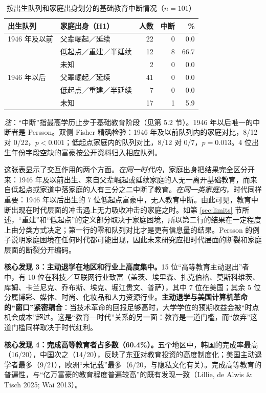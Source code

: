 \documentclass[UTF8,a4paper,11pt]{ctexart}
\begin{document}
\begin{table}[htbp]
\centering
\caption{按出生队列和家庭出身划分的基础教育中断情况（$n=101$）}
\label{tab:h2x}
\small
\begin{tabular}{llrrr}
\toprule
出生队列 & 家庭出身（H1） & 人数 & 中断 & \% \\
\midrule
1946 年及以前 & 父辈崛起／延续 & 22 & 0 & 0.0 \\
              & 低起点／重建／半延续 & 12 & 8 & 66.7 \\
              & 未知 & 2 & 0 & 0.0 \\
\midrule
1946 年以后   & 父辈崛起／延续 & 41 & 0 & 0.0 \\
              & 低起点／重建／半延续 & 7 & 0 & 0.0 \\
              & 未知 & 17 & 1 & 5.9 \\
\bottomrule
\end{tabular}

\smallskip
\parbox{0.92\linewidth}{\footnotesize\emph{注}：“中断”指最高学历止步于基础教育阶段（见第 5.2 节）。1946 年以后唯一的中断者是 Persson。双侧 Fisher 精确检验：1946 年及以前队列内的家庭对比，8/12 对 0/22，$p<0.001$；低起点家庭内的队列对比，8/12 对 0/7，$p=0.013$。4 位出生年份字段空缺的富豪按公开资料归入相应队列。}
\end{table}

这张表显示了交互作用的两个方面。\emph{在同一时代内}，家庭出身把结果完全区分开来：1946 年及以前出生、来自父辈崛起或延续家庭的人无一离开基础教育，而来自低起点或家道中落家庭的人有三分之二中断了教育。\emph{在同一类家庭内}，时代同样重要：1946 年以后出生的 7 位低起点富豪中，无人教育中断。由此可见，教育中断出现在时代层面的冲击遇上无力吸收冲击的家庭之时。如第 \ref{sec:limits} 节所述，“重建”和“低起点”的定义部分取决于家庭困境，所以第二行的结果在一定程度上由分类方式决定；第一行的零和队列对比才是更有信息量的结果。Persson 的例子说明家庭困境在任何时代都可能出现，因此未来研究应把时代层面的断裂和家庭层面的断裂分开编码。

\textbf{核心发现 3：主动退学在地区和行业上高度集中。}15 位“高等教育主动退出”者中，有 10 位在科技／互联网行业致富（盖茨、埃里森、扎克伯格、莫斯科维茨、库姆、卡兰尼克、乔布斯、埃克、堀江贵文、普萨），其中 7 位在美国；其余 5 位分属博彩、媒体、时尚、化妆品和人力资源行业。\textbf{主动退学与美国计算机革命的“窗口”紧密耦合}：当技术革命的回报足够高时，大学学位的预期收益会被“时点机会成本”超过。这是“教育—时代”关系的另一面：教育是一道门槛，而“放弃”这道门槛同样取决于时代红利。

\textbf{核心发现 4：完成高等教育者占多数（60.4\%）。}五个地区中，韩国的完成率最高（16/20），中国次之（14/20），反映了东亚对教育投资的高度制度化；美国主动退学者最多（9/21），欧洲“未记载”最多（6/20，与隐私文化有关）。完成高等教育的普遍性，与“亿万富豪的教育程度普遍较高”的既有发现一致（Lillie, de Alwis \& Tisch 2025; Wai 2013）。
\end{document}
